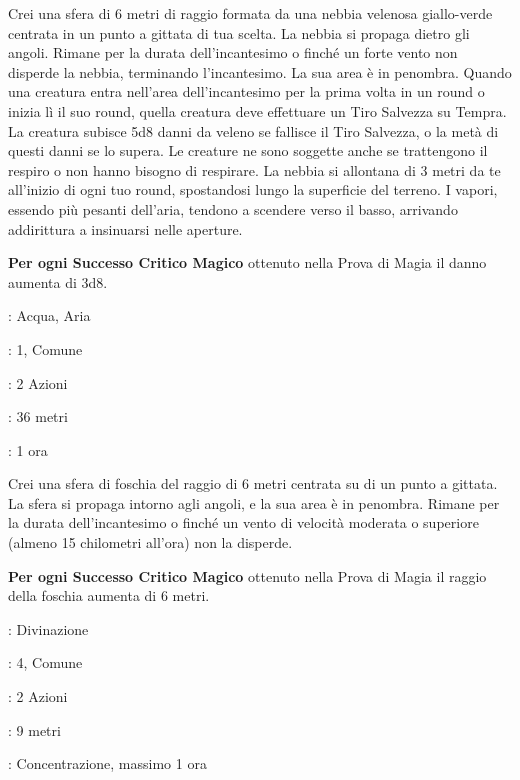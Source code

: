 \begin{multicols}{2}
Crei una sfera di 6 metri di raggio formata da una nebbia velenosa giallo-verde centrata in un punto a gittata di tua scelta. La nebbia si propaga dietro gli angoli. Rimane per la durata dell'incantesimo o finché un forte vento non disperde la nebbia, terminando l'incantesimo. La sua area è in penombra. Quando una creatura entra nell'area dell'incantesimo per la prima volta in un round o inizia lì il suo round, quella creatura deve effettuare un Tiro Salvezza su Tempra. La creatura subisce 5d8 danni da veleno se fallisce il Tiro Salvezza, o la metà di questi danni se lo supera. Le creature ne sono soggette anche se trattengono il respiro o non hanno bisogno di respirare. La nebbia si allontana di 3 metri da te all'inizio di ogni tuo round, spostandosi lungo la superficie del terreno. I vapori, essendo più pesanti dell'aria, tendono a scendere verso il basso, arrivando addirittura a insinuarsi nelle aperture.

\textbf{Per ogni Successo Critico Magico} ottenuto nella Prova di Magia il danno aumenta di 3d8.

\noindent\colorbox{OBSSgold!10}{
\begin{minipage}{0.95\linewidth}
\begin{description}[noitemsep, topsep=0pt, parsep=0pt, partopsep=0pt, leftmargin=0cm, labelwidth=1.3cm]
	\item[\textbf{Lista}]: Acqua, Aria
	\item[\textbf{Livello}]: 1, Comune
	\item[\textbf{Lancio}]: 2 Azioni
	\item[\textbf{Gittata}]: 36 metri
	\item[\textbf{Durata}]: 1 ora
\end{description}
\end{minipage}}\smallskip

Crei una sfera di foschia del raggio di 6 metri centrata su di un punto a gittata. La sfera si propaga intorno agli angoli, e la sua area è in penombra. Rimane per la durata dell'incantesimo o finché un vento di velocità moderata o superiore (almeno 15 chilometri all'ora) non la disperde.

\textbf{Per ogni Successo Critico Magico} ottenuto nella Prova di Magia il raggio della foschia aumenta di 6 metri.

\noindent\colorbox{OBSSgold!10}{
\begin{minipage}{0.95\linewidth}
\begin{description}[noitemsep, topsep=0pt, parsep=0pt, partopsep=0pt, leftmargin=0cm, labelwidth=1.3cm]
	\item[\textbf{Lista}]: Divinazione
	\item[\textbf{Livello}]: 4, Comune
	\item[\textbf{Lancio}]: 2 Azioni
	\item[\textbf{Gittata}]: 9 metri
	\item[\textbf{Durata}]: Concentrazione, massimo 1 ora
\end{description}
\end{minipage}}\smallskip


\end{multicols}
